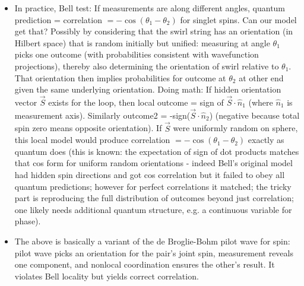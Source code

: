 \documentclass[11pt]{article}
\begin{document}
\begin{itemize}
\item 
In practice, Bell test: If measurements are along different angles, quantum prediction = correlation $= -\cos(\theta_1 - \theta_2)$ for singlet spins. Can our model get that? Possibly by considering that the swirl string has an orientation (in Hilbert space) that is random initially but unified: measuring at angle $\theta_1$ picks one outcome (with probabilities consistent with wavefunction projections), thereby also determining the orientation of swirl relative to $\theta_1$. That orientation then implies probabilities for outcome at $\theta_2$ at other end given the same underlying orientation. Doing math: If hidden orientation vector $\vec{S}$ exists for the loop, then local outcome = sign of $\vec{S}\cdot \hat{n}_1$ (where $\hat{n}_1$ is measurement axis). Similarly outcome2 = -sign($\vec{S}\cdot \hat{n}_2$) (negative because total spin zero means opposite orientation). If $\vec{S}$ were uniformly random on sphere, this local model would produce correlation $= -\cos(\theta_1 - \theta_2)$ exactly as quantum does (this is known: the expectation of sign of dot products matches that cos form for uniform random orientations - indeed Bell’s original model had hidden spin directions and got cos correlation but it failed to obey all quantum predictions; however for perfect correlations it matched; the tricky part is reproducing the full distribution of outcomes beyond just correlation; one likely needs additional quantum structure, e.g. a continuous variable for phase).




\item 
The above is basically a variant of the de Broglie-Bohm pilot wave for spin: pilot wave picks an orientation for the pair’s joint spin, measurement reveals one component, and nonlocal coordination ensures the other’s result. It violates Bell locality but yields correct correlation.





\end{itemize}
\end{document}
